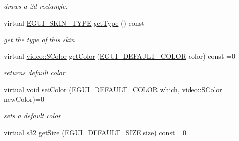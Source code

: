 \begin{DoxyCompactItemize}
\begin{DoxyCompactList}\small\item\em draws a 2d rectangle. \end{DoxyCompactList}\item 
\mbox{\label{classirr_1_1gui_1_1IGUISkin_ad42c8e52f5e60d27d065f6546446d9ff}} 
virtual \hyperlink{namespaceirr_1_1gui_a7b4619db540cbdf96e81023893b4eca5}{E\+G\+U\+I\+\_\+\+S\+K\+I\+N\+\_\+\+T\+Y\+PE} \hyperlink{classirr_1_1gui_1_1IGUISkin_ad42c8e52f5e60d27d065f6546446d9ff}{get\+Type} () const
\begin{DoxyCompactList}\small\item\em get the type of this skin \end{DoxyCompactList}\item 
\mbox{\label{classirr_1_1gui_1_1IGUISkin_ad1afa2e5e34c30e0cbfb85b1dee2dbe3}} 
virtual \hyperlink{classirr_1_1video_1_1SColor}{video\+::\+S\+Color} \hyperlink{classirr_1_1gui_1_1IGUISkin_ad1afa2e5e34c30e0cbfb85b1dee2dbe3}{get\+Color} (\hyperlink{namespaceirr_1_1gui_abd15860fde29833c48daff5f95d5467a}{E\+G\+U\+I\+\_\+\+D\+E\+F\+A\+U\+L\+T\+\_\+\+C\+O\+L\+OR} color) const =0
\begin{DoxyCompactList}\small\item\em returns default color \end{DoxyCompactList}\item 
\mbox{\label{classirr_1_1gui_1_1IGUISkin_ab9782296ba881872207a0915a81d7807}} 
virtual void \hyperlink{classirr_1_1gui_1_1IGUISkin_ab9782296ba881872207a0915a81d7807}{set\+Color} (\hyperlink{namespaceirr_1_1gui_abd15860fde29833c48daff5f95d5467a}{E\+G\+U\+I\+\_\+\+D\+E\+F\+A\+U\+L\+T\+\_\+\+C\+O\+L\+OR} which, \hyperlink{classirr_1_1video_1_1SColor}{video\+::\+S\+Color} new\+Color)=0
\begin{DoxyCompactList}\small\item\em sets a default color \end{DoxyCompactList}\item 
\mbox{\label{classirr_1_1gui_1_1IGUISkin_ac48a8a0b6cdccacfa90a0fb23e4d9503}} 
virtual \hyperlink{namespaceirr_ac66849b7a6ed16e30ebede579f9b47c6}{s32} \hyperlink{classirr_1_1gui_1_1IGUISkin_ac48a8a0b6cdccacfa90a0fb23e4d9503}{get\+Size} (\hyperlink{namespaceirr_1_1gui_a27be6aa12d4985a5005983182fe99d56}{E\+G\+U\+I\+\_\+\+D\+E\+F\+A\+U\+L\+T\+\_\+\+S\+I\+ZE} size) const =0

\end{DoxyCompactItemize}
